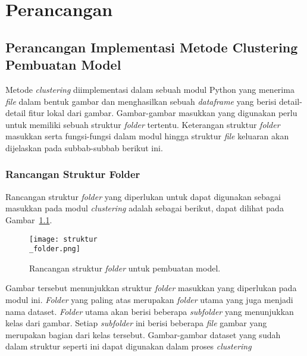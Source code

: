 \chapter{Perancangan}

\section{Perancangan Implementasi Metode Clustering Pembuatan Model} 
Metode \textit{clustering} diimplementasi dalam sebuah modul Python yang menerima \textit{file} dalam bentuk gambar dan menghasilkan sebuah \textit{dataframe} yang berisi detail-detail fitur lokal dari gambar. Gambar-gambar masukkan yang digunakan perlu untuk memiliki sebuah struktur \textit{folder} tertentu. Keterangan struktur \textit{folder} masukkan serta fungsi-fungsi dalam modul hingga struktur \textit{file} keluaran akan dijelaskan pada subbab-subbab berikut ini.

\subsection{Rancangan Struktur Folder}
\label{subsec:struktur_folder_clustering}
Rancangan struktur \textit{folder} yang diperlukan untuk dapat digunakan sebagai masukkan pada modul \textit{clustering} adalah sebagai berikut, dapat dilihat pada Gambar~\ref{fig:struktur_folder}.
\begin{figure}[H]
	\centering
	\texttt{[image: struktur\\\_folder.png]}
	\caption{Rancangan struktur \textit{folder} untuk pembuatan model.}
	\label{fig:struktur_folder}
\end{figure}
Gambar tersebut menunjukkan struktur \textit{folder} masukkan yang diperlukan pada modul ini. \textit{Folder} yang paling atas merupakan \textit{folder} utama yang juga menjadi nama dataset. \textit{Folder} utama akan berisi beberapa \textit{subfolder} yang menunjukkan kelas dari gambar. Setiap \textit{subfolder} ini berisi beberapa \textit{file} gambar yang merupakan bagian dari kelas tersebut. Gambar-gambar dataset yang sudah dalam struktur seperti ini dapat digunakan dalam proses \textit{clustering}

